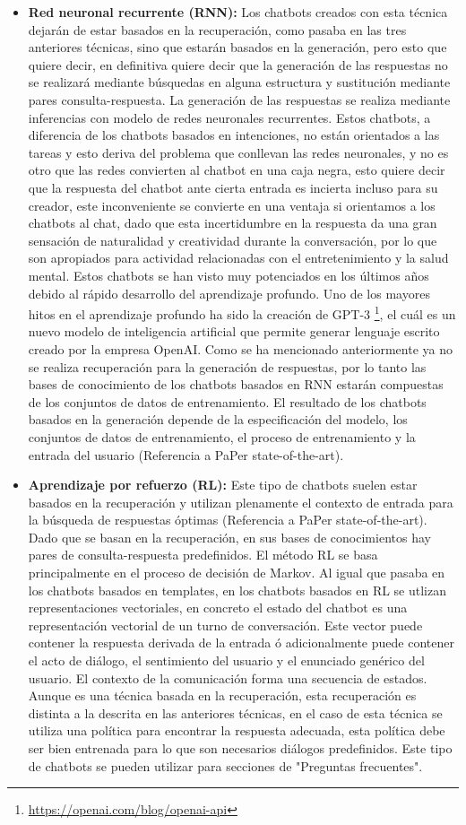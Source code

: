\begin{itemize}
    \item \textbf{Red neuronal recurrente (RNN):} Los chatbots creados con esta técnica dejarán de estar basados en la recuperación, como pasaba en las tres anteriores técnicas, sino que estarán basados en la generación, pero esto que quiere decir, en definitiva quiere decir que la generación de las respuestas no se realizará mediante búsquedas en alguna estructura y sustitución mediante pares consulta-respuesta. La generación de las respuestas se realiza mediante inferencias con modelo de redes neuronales recurrentes. Estos chatbots, a diferencia de los chatbots basados en intenciones, no están orientados a las tareas y esto deriva del problema que conllevan las redes neuronales, y no es otro que las redes convierten al chatbot en una caja negra, esto quiere decir que la respuesta del chatbot ante cierta entrada es incierta incluso para su creador, este inconveniente se convierte en una ventaja si orientamos a los chatbots al chat, dado que esta incertidumbre en la respuesta da una gran sensación de naturalidad y creatividad durante la conversación, por lo que son apropiados para actividad relacionadas con el entretenimiento y la salud mental. Estos chatbots se han visto muy potenciados en los últimos años debido al rápido desarrollo del aprendizaje profundo. Uno de los mayores hitos en el aprendizaje profundo ha sido la creación de GPT-3 \footnote{\url{https://openai.com/blog/openai-api}}, el cuál es un nuevo modelo de inteligencia artificial que permite generar lenguaje escrito creado por la empresa OpenAI. Como se ha mencionado anteriormente ya no se realiza recuperación para la generación de respuestas, por lo tanto las bases de conocimiento de los chatbots basados en RNN estarán compuestas de los conjuntos de datos de entrenamiento. El resultado de los chatbots basados en la generación depende de la especificación del modelo, los conjuntos de datos de entrenamiento, el proceso de entrenamiento y la entrada del usuario (Referencia a PaPer state-of-the-art).
    \item \textbf{Aprendizaje por refuerzo (RL):} Este tipo de chatbots suelen estar basados en la recuperación y utilizan plenamente el contexto de entrada para la búsqueda de respuestas óptimas (Referencia a PaPer state-of-the-art). Dado que se basan en la recuperación, en sus bases de conocimientos hay pares de consulta-respuesta predefinidos. El método RL se basa principalmente en el proceso de decisión de Markov. Al igual que pasaba en los chatbots basados en templates, en los chatbots basados en RL se utlizan representaciones vectoriales, en concreto el estado del chatbot es una representación vectorial de un turno de conversación. Este vector puede contener la respuesta derivada de la entrada ó adicionalmente puede contener el acto de diálogo, el sentimiento del usuario y el enunciado genérico del usuario. El contexto de la comunicación forma una secuencia de estados. Aunque es una técnica basada en la recuperación, esta recuperación es distinta a la descrita en las anteriores técnicas, en el caso de esta técnica se utiliza una política para encontrar la respuesta adecuada, esta política debe ser bien entrenada para lo que son necesarios diálogos predefinidos. Este tipo de chatbots se pueden utilizar para secciones de "Preguntas frecuentes".

\end{itemize}
